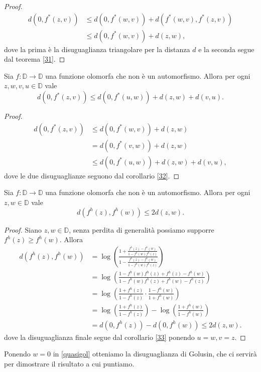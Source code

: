 \begin{proof}
  \begin{align*}
    d(0,f^*(z,v)) & \le d(0,f^*(w,v))+d(f^*(w,v),f^*(z,v)) \\
    & \le d(0,f^*(w,v))+d(z,w),
  \end{align*}
  dove la prima è la disuguaglianza triangolare per la distanza $d$ e la seconda segue dal teorema \ref{31}.
\end{proof}

\begin{cor} \label{33}
  Sia $f:\mathbb{D} \longrightarrow \mathbb{D}$ una funzione olomorfa che non è un automorfismo. Allora per ogni $z, w, v, u \in \mathbb{D}$ vale
  \begin{equation}
    d(0, f^*(z,v)) \le d(0, f^*(u,w))+d(z,w)+d(v,u).
  \end{equation}
\end{cor}

\begin{proof}
  \begin{align*}
    d(0,f^*(z,v)) & \le d(0,f^*(w,v))+d(z,w) \\
    & =d(0,f^*(v,w))+d(z,w) \\
    & \le d(0,f^*(u,w))+d(z,w)+d(v,u),
  \end{align*}
  dove le due disuguaglianze seguono dal corollario \ref{32}.
\end{proof}

\begin{cor} \label{quasigolusin}
  Sia $f:\mathbb{D} \longrightarrow \mathbb{D}$ una funzione olomorfa che non è un automorfismo. Allora per ogni $z, w \in \mathbb{D}$ vale
  \begin{equation} \label{quasigol}
    d(f^h(z), f^h(w)) \le 2d(z,w).
  \end{equation}
\end{cor}

\begin{proof}
  Siano $z, w \in \mathbb{D}$, senza perdita di generalità possiamo supporre $f^h(z) \ge f^h(w)$. Allora
  \begin{align*}
    d(f^h(z), f^h(w)) & =\log\left(\frac{1+\frac{f^h(z)-f^h(w)}{1-f^h(w)f^h(z)}}{1-\frac{f^h(z)-f^h(w)}{1-f^h(w)f^h(z)}}\right) \\
    & =\log\left(\frac{1-f^h(w)f^h(z)+f^h(z)-f^h(w)}{1-f^h(w)f^h(z)+f^h(w)-f^h(z)}\right) \\
    & =\log\left(\frac{1+f^h(z)}{1-f^h(z)}\cdot\frac{1-f^h(w)}{1+f^h(w)}\right) \\
    & =\log\left(\frac{1+f^h(z)}{1-f^h(z)}\right)-\log\left(\frac{1+f^h(w)}{1-f^h(w)}\right) \\
    & =d(0,f^h(z))-d(0,f^h(w)) \le 2d(z,w).
  \end{align*}
  dove la disuguaglianza finale segue dal corollario \ref{33} ponendo $u=w, v=z$.
\end{proof}

Ponendo $w=0$ in \eqref{quasigol} otteniamo la disuguaglianza di Golusin, che ci servirà per dimostrare il risultato a cui puntiamo.
